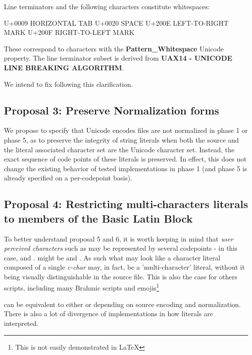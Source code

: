 \documentclass{wg21}
\newcommand{\UnicodeLetter}[1]{\textbf{\textcolor{BrickRed}{\Large\tcode{#1}}}}
\begin{document}
Line terminators and the following characters constitute whitespaces:

\begin{codeblock}
U+0009 HORIZONTAL TAB
U+0020 SPACE
U+200E LEFT-TO-RIGHT MARK
U+200F RIGHT-TO-LEFT MARK
\end{codeblock}

These correspond to characters with the \textbf{Pattern_Whitespace} Unicode property.
The line terminator subset is derived from \textbf{UAX14 - UNICODE LINE BREAKING ALGORITHM}.

We intend to fix  following this clarification.

\subsection{Proposal 3: Preserve Normalization forms}

We propose to specify that Unicode encodes files are not normalized in phase 1 or phase 5, as to preserve the integrity
of string literals when both the source and the literal associated character set are the Unicode character set.
Instead, the exact sequence of code points of these literals is preserved.
In effect, this does not change the existing behavior of tested implementations in phase 1 (and phase 5 is already specified on a per-codepoint basis).

\pagebreak

\subsection{Proposal 4: Restricting multi-characters literals to members of the Basic Latin Block}
To better understand proposal 5 and 6, it is worth keeping in mind that \emph{user perceived characters} such as \UnicodeLetter{공} may be represented by several codepoints - in this case, \UnicodeLetter{ㄱ} and \UnicodeLetter{ㅎ}. \UnicodeLetter{é} might be \UnicodeLetter{e} and \UnicodeLetter{´}. As such what may look like a character literal composed of a single \emph{c-char} may, in fact, be a 'multi-character' literal, without it being visually distinguishable in the source file.
This is also the case for others scripts, including many Brahmic scripts and emojis\footnote{This is not easily demonstrated in \LaTeX}



can be equivalent to either  or 
depending on source encoding and normalization.
There is also a lot of divergence of implementations in how literals are interpreted.
\end{document}
